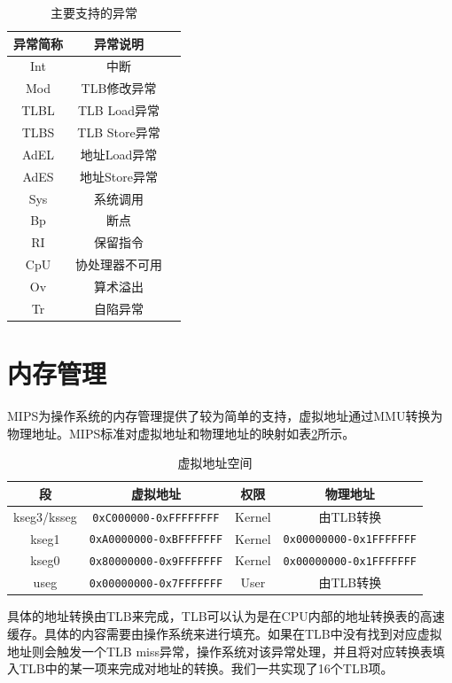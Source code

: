 \begin{table}[htbp]
	\centering
	\begin{tabular}{|c|c|l|} \hline
		\textbf{异常简称} & \textbf{异常说明} \\ \hline
		Int & 中断  \\ \hline
		Mod & TLB修改异常 \\ \hline
		TLBL & TLB Load异常 \\ \hline
		TLBS & TLB Store异常 \\ \hline
		AdEL & 地址Load异常 \\ \hline
		AdES & 地址Store异常 \\ \hline
		Sys & 系统调用 \\ \hline
		Bp & 断点 \\ \hline
		RI & 保留指令 \\ \hline
		CpU & 协处理器不可用 \\ \hline
		Ov & 算术溢出 \\ \hline
		Tr & 自陷异常 \\ \hline
	\end{tabular}
	\caption{主要支持的异常}
	\label{table:main-exception}
\end{table}
\section{内存管理}
MIPS为操作系统的内存管理提供了较为简单的支持，虚拟地址通过MMU转换为物理地址。MIPS标准对虚拟地址和物理地址的映射如表\ref{tab:virtual-address-space}所示。

\begin{table}[htbp]
	\centering
	\begin{tabular}{|c|c|c|c|} \hline
		\textbf{段} & \textbf{虚拟地址} & \textbf{权限} & \textbf{物理地址} \\ \hline
		kseg3/ksseg & \texttt{0xC000000-0xFFFFFFFF} & Kernel & 由TLB转换 \\ \hline
		kseg1 & \texttt{0xA0000000-0xBFFFFFFF} & Kernel & \texttt{0x00000000-0x1FFFFFFF} \\ \hline
		kseg0 & \texttt{0x80000000-0x9FFFFFFF} & Kernel & \texttt{0x00000000-0x1FFFFFFF} \\ \hline
		useg &  \texttt{0x00000000-0x7FFFFFFF} & User & 由TLB转换 \\ \hline
	\end{tabular}
	\caption{虚拟地址空间}
	\label{tab:virtual-address-space}
\end{table}

具体的地址转换由TLB来完成，TLB可以认为是在CPU内部的地址转换表的高速缓存。具体的内容需要由操作系统来进行填充。如果在TLB中没有找到对应虚拟地址则会触发一个TLB miss异常，操作系统对该异常处理，并且将对应转换表填入TLB中的某一项来完成对地址的转换。我们一共实现了16个TLB项。

